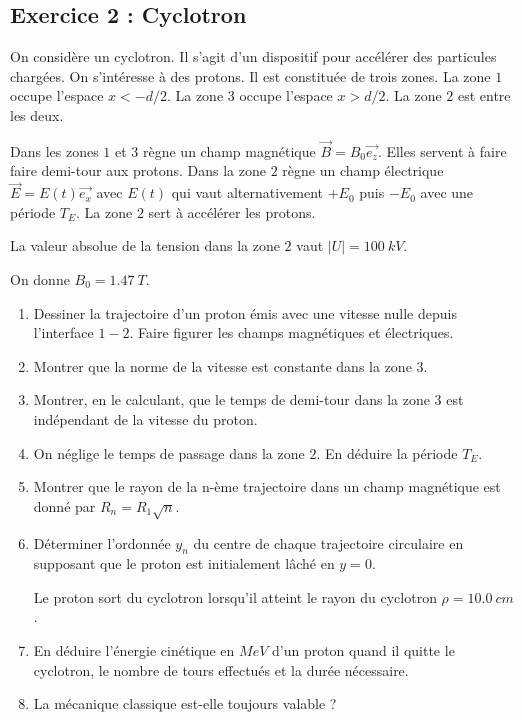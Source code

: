 \subsection{Exercice 2 : Cyclotron}

On considère un cyclotron. Il s'agit d'un dispositif pour accélérer des particules chargées. On s'intéresse à des protons. Il est constituée de trois zones. La zone $1$ occupe l'espace $x < -d/2$. La zone $3$ occupe l'espace $x > d/2$. La zone $2$ est entre les deux.

Dans les zones $1$ et $3$ règne un champ magnétique $\vec{B} = B_0 \vec{e_z}$. Elles servent à faire faire demi-tour aux protons. Dans la zone $2$ règne un champ électrique $\vec{E} = E(t) \vec{e_x}$ avec $E(t)$ qui vaut alternativement $+E_0$ puis $-E_0$ avec une période $T_E$. La zone $2$ sert à accélérer les protons. 

La valeur absolue de la tension dans la zone $2$ vaut $|U| = \SI{100}{kV}$.

On donne $B_0 = \SI{1.47}{T}$.

\begin{enumerate}
	\item Dessiner la trajectoire d'un proton émis avec une vitesse nulle depuis l'interface $1-2$. Faire figurer les champs magnétiques et électriques.
	\item Montrer que la norme de la vitesse est constante dans la zone $3$.
	\item Montrer, en le calculant, que le temps de demi-tour dans la zone $3$ est indépendant de la vitesse du proton.
	\item On néglige le temps de passage dans la zone $2$. En déduire la période $T_E$.
	\item Montrer que le rayon de la n-ème trajectoire dans un champ magnétique est donné par $R_n = R_1 \sqrt{n}$.
	\item Déterminer l'ordonnée $y_n$ du centre de chaque trajectoire circulaire en supposant que le proton est initialement lâché en $y=0$.
	
	Le proton sort du cyclotron lorsqu'il atteint le rayon du cyclotron $\rho = \SI{10.0}{cm}$. 
	
	\item En déduire l'énergie cinétique en $MeV$ d'un proton quand il quitte le cyclotron, le nombre de tours effectués et la durée nécessaire. 
	\item La mécanique classique est-elle toujours valable ?
\end{enumerate}

